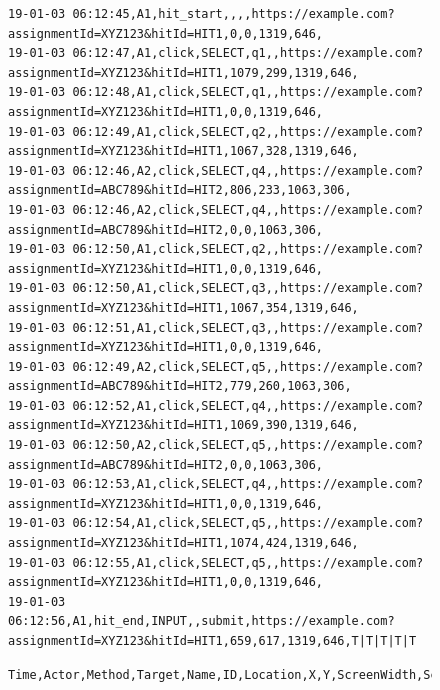 \begin{figure}
\vspace{-8pt}
\begin{lstlisting}[basicstyle=\footnotesize\ttfamily,caption=Example log file capturing two user sessions at the same time. Note that there were far more interactions captured during the study and that this is a small contrived slice of the data. Much of the information from the URL has been redacted.,label=lst:logs]
19-01-03 06:12:45,A1,hit_start,,,,https://example.com?assignmentId=XYZ123&hitId=HIT1,0,0,1319,646,
19-01-03 06:12:47,A1,click,SELECT,q1,,https://example.com?assignmentId=XYZ123&hitId=HIT1,1079,299,1319,646,
19-01-03 06:12:48,A1,click,SELECT,q1,,https://example.com?assignmentId=XYZ123&hitId=HIT1,0,0,1319,646,
19-01-03 06:12:49,A1,click,SELECT,q2,,https://example.com?assignmentId=XYZ123&hitId=HIT1,1067,328,1319,646,
19-01-03 06:12:46,A2,click,SELECT,q4,,https://example.com?assignmentId=ABC789&hitId=HIT2,806,233,1063,306,
19-01-03 06:12:46,A2,click,SELECT,q4,,https://example.com?assignmentId=ABC789&hitId=HIT2,0,0,1063,306,
19-01-03 06:12:50,A1,click,SELECT,q2,,https://example.com?assignmentId=XYZ123&hitId=HIT1,0,0,1319,646,
19-01-03 06:12:50,A1,click,SELECT,q3,,https://example.com?assignmentId=XYZ123&hitId=HIT1,1067,354,1319,646,
19-01-03 06:12:51,A1,click,SELECT,q3,,https://example.com?assignmentId=XYZ123&hitId=HIT1,0,0,1319,646,
19-01-03 06:12:49,A2,click,SELECT,q5,,https://example.com?assignmentId=ABC789&hitId=HIT2,779,260,1063,306,
19-01-03 06:12:52,A1,click,SELECT,q4,,https://example.com?assignmentId=XYZ123&hitId=HIT1,1069,390,1319,646,
19-01-03 06:12:50,A2,click,SELECT,q5,,https://example.com?assignmentId=ABC789&hitId=HIT2,0,0,1063,306,
19-01-03 06:12:53,A1,click,SELECT,q4,,https://example.com?assignmentId=XYZ123&hitId=HIT1,0,0,1319,646,
19-01-03 06:12:54,A1,click,SELECT,q5,,https://example.com?assignmentId=XYZ123&hitId=HIT1,1074,424,1319,646,
19-01-03 06:12:55,A1,click,SELECT,q5,,https://example.com?assignmentId=XYZ123&hitId=HIT1,0,0,1319,646,
19-01-03 06:12:56,A1,hit_end,INPUT,,submit,https://example.com?assignmentId=XYZ123&hitId=HIT1,659,617,1319,646,T|T|T|T|T
\end{lstlisting}
\vspace{-8pt}
\begin{lstlisting}[caption=Order of event components in Listing~\ref{lst:logs},label=lst:components]
	Time,Actor,Method,Target,Name,ID,Location,X,Y,ScreenWidth,ScreenHeight,Comment
\end{lstlisting}
\vspace{-8pt}
\end{figure}

